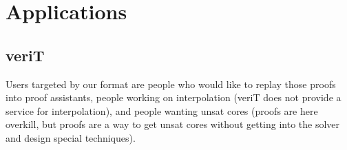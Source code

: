 \documentclass{llncs}
\begin{document}








\section{Applications}
\label{sec:app}

\subsection{veriT}

Users targeted by our format are people who would like to replay those proofs into proof assistants, people working on interpolation (veriT does not provide a service for interpolation), and people wanting unsat cores (proofs are here overkill, but proofs are a way to get unsat cores without getting into the solver and design special techniques).
\end{document}
